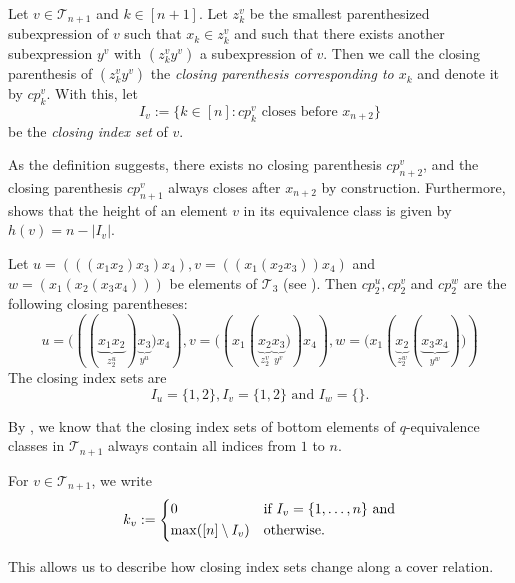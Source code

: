 \documentclass{preprint}
\newcommand{\cT}{\mathcal{T}}
\theoremstyle{definition}
\begin{document}
\begin{definition}\label{def: closing parenthesis}
    Let $v \in \cT_{n+1}$ and $k \in [n+1]$. Let $z_k^v$ be the smallest parenthesized subexpression of $v$ such that $x_k \in z_k^v$ and such that there exists another subexpression $y^v$ with $(z_k^vy^v)$ a subexpression of $v$. Then we call the closing parenthesis of $(z_k^vy^v)$ the \textit{closing parenthesis corresponding to $x_k$} and denote it by $cp^v_k$. With this, let
    $$I_v:=\{k \in [n]: cp_k^v \text{ closes before } x_{n+2}\}$$
    be the \textit{closing index set} of $v$.
\end{definition}

As the definition suggests, there exists no closing parenthesis $cp^v_{n+2}$, and the closing parenthesis $cp^v_{n+1}$ always closes after $x_{n+2}$ by construction.
Furthermore,  shows that the height of an element $v$ in its equivalence class is given by $h(v)=n - |I_v|$.

\begin{example}
    Let $u = (((x_1x_2)x_3)x_4), v=((x_1(x_2x_3))x_4)$ and $w=(x_1(x_2(x_3x_4)))$ be elements of $\cT_3$ (see ). Then $cp_2^u, cp_2^v$ and $cp_2^w$ are the following closing parentheses:
    $$
        u = (((\underbrace{x_1x_2}_{z_2^u})\underbrace{x_3}_{y^u}\pmb{)}x_4), v = ((x_1(\underbrace{x_2}_{z_2^v}\underbrace{x_3}_{y^v}\pmb{)})x_4), w = (x_1(\underbrace{x_2}_{z_2^w}(\underbrace{x_3x_4}_{y^w})\pmb{)})
    $$
    The closing index sets are
    $$
        I_u = \{1,2\}, I_v = \{1,2\} \text{ and } I_w = \{\}.
    $$
\end{example}

By , we know that the closing index sets of bottom elements of $q$-equivalence classes in $\cT_{n+1}$ always contain all indices from $1$ to $n$. 

For $v \in \cT_{n+1}$, we write
\[ k_v :=
    \begin{cases*}
    0 & if $I_v = \{1,\dots,n\}$ and\\
      \max([n] \setminus I_v) & otherwise.
    \end{cases*}
\]

This allows us to describe how closing index sets change along a cover relation.
\end{document}
